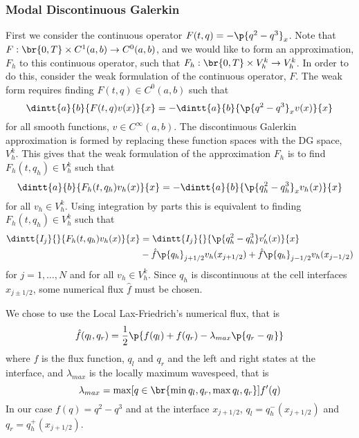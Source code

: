 \subsubsection{Modal Discontinuous Galerkin}\label{ssec:dg}
First we consider the continuous operator \(F(t, q) = -\p{q^2 - q^3}_x\).
Note that \(F: \br{0, T} \times C^1(a, b) \to C^0(a, b)\), and we would like to
form an approximation, \(F_h\) to this continuous operator, such that
\(F_h: \br{0, T} \times V_h^k \to V_h^k\).
In order to do this, consider the weak formulation of the continuous operator,
\(F\).
The weak form requires finding \(F(t, q) \in C^0(a, b)\) such that
\begin{equation}
  \dintt{a}{b}{F(t, q) v(x)}{x} = -\dintt{a}{b}{\p{q^2 - q^3}_x v(x)}{x}
\end{equation}
for all smooth functions, \(v \in C^{\infty}(a, b)\).
The discontinuous Galerkin approximation is formed by replacing these function
spaces with the DG space, \(V_h^k\).
This gives that the weak formulation of the approximation \(F_h\) is to find
\(F_h(t, q_h) \in V_h^k\) such that
\begin{equation}
  \dintt{a}{b}{F_h(t, q_h) v_h(x)}{x} = -\dintt{a}{b}{\p{q_h^2 - q_h^3}_x v_h(x)}{x}
\end{equation}
for all \(v_h \in V_h^k\).
Using integration by parts this is equivalent to
finding \(F_h(t, q_h) \in V_h^k\) such that
\begin{align}
  \dintt{I_j}{}{F_h(t, q_h)v_h(x)}{x} &= \dintt{I_j}{}{\p{q_h^2 - q_h^3} v_h'(x)}{x} \\
  &- \hat{f}\p{q_h}_{j+1/2} v_h(x_{j+1/2}) + \hat{f}\p{q_h}_{j-1/2} v_h(x_{j-1/2}) \nonumber
\end{align}
for \(j = 1, \ldots, N\) and for all \(v_h \in V_h^k\).
Since \(q_h\) is discontinuous at the cell interfaces \(x_{j\pm 1/2}\), some
numerical flux \(\hat{f}\) must be chosen.

We chose to use the Local Lax-Friedrich's numerical flux, that is
\begin{equation}
  \hat{f}(q_l, q_r) = \frac{1}{2} \p{f(q_l) + f(q_r) - \lambda_{max} \p{q_r - q_l}}
\end{equation}
where \(f\) is the flux function, \(q_l\) and \(q_r\) and the left and right
states at the interface, and \(\lambda_{max}\) is the locally maximum wavespeed,
that is
\begin{equation}
  \lambda_{max} = \max[q \in \br{\min{q_l, q_r}, \max{q_l, q_r}}]{f'(q)}
\end{equation}
In our case \(f(q) = q^2 - q^3\) and at the interface \(x_{j+1/2}\),
\(q_l = q_h^-(x_{j+1/2})\) and \(q_r = q_h^+(x_{j+1/2})\).

